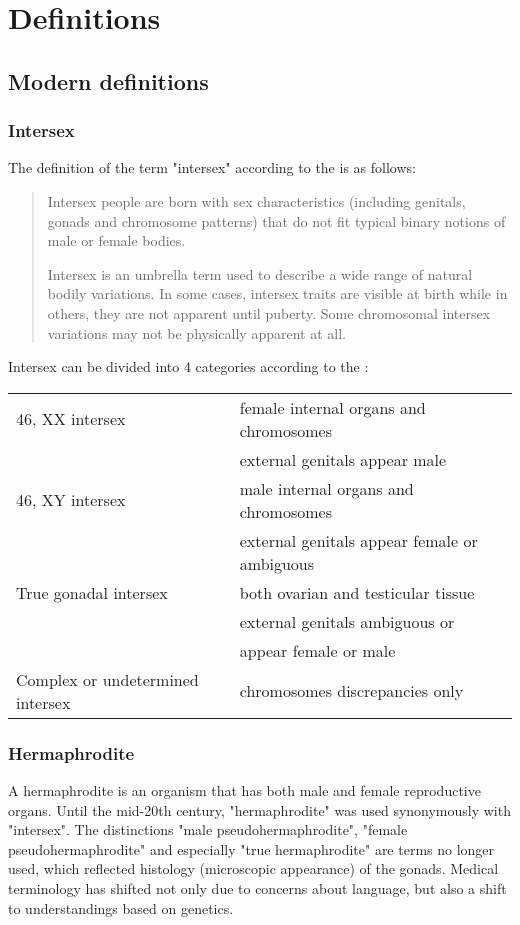 \section{Definitions}
\subsection{Modern definitions}
\subsubsection{Intersex}
The definition of the term "intersex" according to the \cite{un2015} is as follows:

\begin{quote}
Intersex people are born with sex characteristics (including genitals, gonads and chromosome patterns) that do not fit typical binary notions of male or female bodies.

Intersex is an umbrella term used to describe a wide range of natural bodily variations. In some cases, intersex traits are visible at birth while in others, they are not apparent until puberty. Some chromosomal intersex variations may not be physically apparent at all.
\end{quote}

Intersex can be divided into 4 categories according to the \cite{nlm}:

\begin{tabular}{ l l }
46, XX intersex & female internal organs and chromosomes \\
& external genitals appear male \\
46, XY intersex & male internal organs and chromosomes \\
& external genitals appear female or ambiguous \\
True gonadal intersex & both ovarian and testicular tissue \\
& external genitals ambiguous or \\
& appear female or male \\
Complex or undetermined intersex & chromosomes discrepancies only \\
\end{tabular}


\subsubsection{Hermaphrodite}
A hermaphrodite is an organism that has both male and female reproductive organs. Until the mid-20th century, "hermaphrodite" was used synonymously with "intersex". The distinctions "male pseudohermaphrodite", "female pseudohermaphrodite" and especially "true hermaphrodite" are terms no longer used, which reflected histology (microscopic appearance) of the gonads. Medical terminology has shifted not only due to concerns about language, but also a shift to understandings based on genetics.

